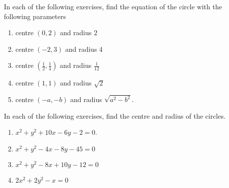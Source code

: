 In each of the following exercises, find the equation of the circle with the following parameters
\begin{enumerate}[label=\thesection.\arabic*,ref=\thesection.\theenumi]
 \item centre $(0,2)$ and radius $2$
	 \\
		\solution
\label{chapters/11/11/1/1}

%
  \item centre $(-2,3)$ and radius 4
	 \\
		\solution
\label{chapters/11/11/1/2}


  \item centre $\left(\frac{1}{2}, \frac{1}{4}\right)$ and radius $\frac{1}{12}$
\label{chapters/11/11/1/3}
	 \\
		\solution


  \item centre $(1,1)$ and radius $\sqrt{2}$
	 \\
		\solution


  \item centre $(-a,-b)$ and radius $\sqrt{a^{2}-b^{2}}$.
	 \\
		\solution
\label{chapters/11/11/1/5}

\end{enumerate}


In each of the following exercises,  find the centre and radius of the circles.
\begin{enumerate}[resume*]
\item  $x^2+y^2 +10x -6y -2=0$. 
	 \\
		\solution
\label{chapters/11/11/1/6}

\item  $x^{2}+y^{2}-4 x-8 y-45=0$
\item  $x^{2}+y^{2}-8 x+10 y-12=0$ 
	 \\
		\solution
\label{chapters/11/11/1/8}

\item  $2 x^{2}+2 y^{2}-x=0$
	 \\
		\solution
\label{chapters/11/11/1/9}

\end{enumerate}

